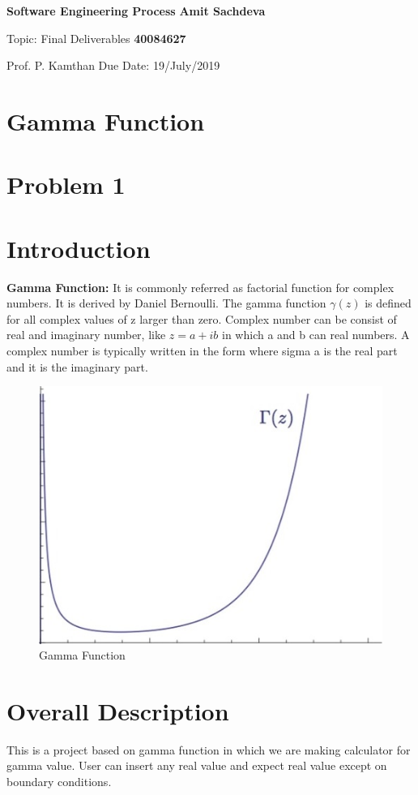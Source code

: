 \documentclass{article}
\begin{document}
\noindent
\large\textbf{Software Engineering Process} \hfill \textbf{Amit Sachdeva} 

\normalsize Topic: Final Deliverables \hfill \textbf{40084627} 

Prof. P. Kamthan \hfill Due Date: 19/July/2019

\begin{center}
    \section*{Gamma Function}
    \section*{Problem 1}
\end{center}
\section{Introduction} 
\textbf{Gamma Function: } It is commonly referred as factorial function for complex numbers. It is derived by Daniel Bernoulli. The gamma function $\gamma(z)$ is defined for all complex values of z larger than zero. Complex number can be consist of real and imaginary number, like $z = a + i b$ in which a and b can real numbers. A complex number is typically written in the form where sigma a is the real part and it is the imaginary part.
\begin{figure}[h!]
\centering
\includegraphics[scale=0.4]{gamma1}
\caption{Gamma Function}
\label{fig:Gamma Function}
\end{figure}
\section{Overall Description} 
This is a project based on gamma function in which we are making calculator for gamma value. User can insert any real value and expect real value except on boundary conditions.
\end{document}
